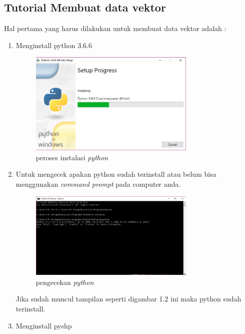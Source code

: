 \subsection{Tutorial Membuat data vektor}
Hal pertama yang harus dilakukan untuk membuat data vektor adalah :
\begin{enumerate}
\item Menginstall python 3.6.6

\begin{figure}[htbp]
\centering
\includegraphics[width=0.75\textwidth]{pictures/python.jpg}
\caption{peroses instalasi \textit{python}}
\label{labelgambar1}
\end{figure}

\item Untuk mengecek apakan python sudah terinstall atau belum bisa menggunakan \textit{command prompt} pada computer anda.

\begin{figure}[htbp]
\centering
\includegraphics[width=0.75\textwidth]{pictures/pengecekanpython.jpg}
\caption{pengecekan \textit{python}}
\label{labelgambar2}
\end{figure}

Jika sudah muncul tampilan seperti digambar 1.2  ini maka python sudah terinstall.
\item Menginstall pyshp
\end{enumerate}

